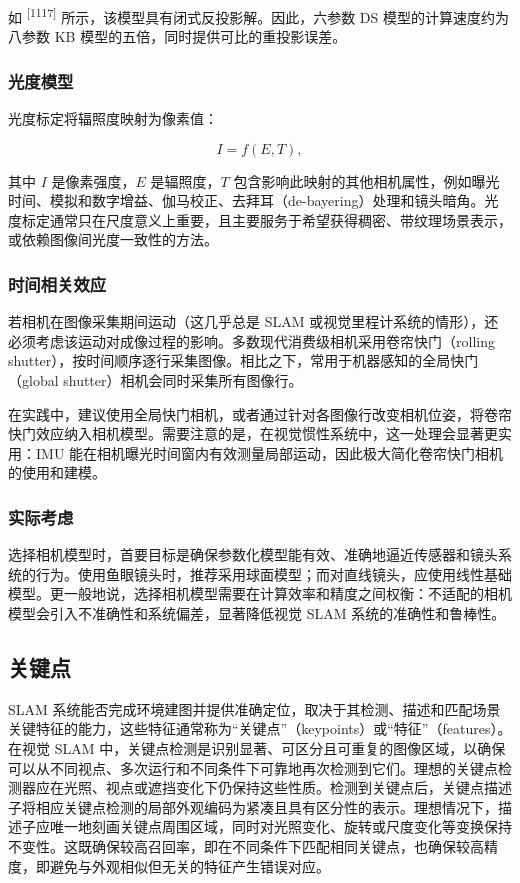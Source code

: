 如 \textsuperscript{[1117]} 所示，该模型具有闭式反投影解。因此，六参数 DS 模型的计算速度约为八参数 KB 模型的五倍，同时提供可比的重投影误差。

\subsubsection{光度模型}

光度标定将辐照度映射为像素值：

\begin{equation*}
I = f (E, T),
\end{equation*}

其中 $I$ 是像素强度，$E$ 是辐照度，$T$ 包含影响此映射的其他相机属性，例如曝光时间、模拟和数字增益、伽马校正、去拜耳（de-bayering）处理和镜头暗角。光度标定通常只在尺度意义上重要，且主要服务于希望获得稠密、带纹理场景表示，或依赖图像间光度一致性的方法。

\subsubsection{时间相关效应}

若相机在图像采集期间运动（这几乎总是 SLAM 或视觉里程计系统的情形），还必须考虑该运动对成像过程的影响。多数现代消费级相机采用卷帘快门（rolling shutter），按时间顺序逐行采集图像。相比之下，常用于机器感知的全局快门（global shutter）相机会同时采集所有图像行。

在实践中，建议使用全局快门相机，或者通过针对各图像行改变相机位姿，将卷帘快门效应纳入相机模型。需要注意的是，在视觉惯性系统中，这一处理会显著更实用：IMU 能在相机曝光时间窗内有效测量局部运动，因此极大简化卷帘快门相机的使用和建模。

\subsubsection{实际考虑}

选择相机模型时，首要目标是确保参数化模型能有效、准确地逼近传感器和镜头系统的行为。使用鱼眼镜头时，推荐采用球面模型；而对直线镜头，应使用线性基础模型。更一般地说，选择相机模型需要在计算效率和精度之间权衡：不适配的相机模型会引入不准确性和系统偏差，显著降低视觉 SLAM 系统的准确性和鲁棒性。

\subsection{关键点}

SLAM 系统能否完成环境建图并提供准确定位，取决于其检测、描述和匹配场景关键特征的能力，这些特征通常称为“关键点”（keypoints）或“特征”（features）。在视觉 SLAM 中，关键点检测是识别显著、可区分且可重复的图像区域，以确保可以从不同视点、多次运行和不同条件下可靠地再次检测到它们。理想的关键点检测器应在光照、视点或遮挡变化下仍保持这些性质。检测到关键点后，关键点描述子将相应关键点检测的局部外观编码为紧凑且具有区分性的表示。理想情况下，描述子应唯一地刻画关键点周围区域，同时对光照变化、旋转或尺度变化等变换保持不变性。这既确保较高召回率，即在不同条件下匹配相同关键点，也确保较高精度，即避免与外观相似但无关的特征产生错误对应。

